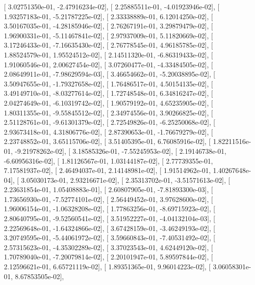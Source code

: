 \documentclass{article}
\begin{document}
       [  3.02751350e-01,  -2.47916234e-02],
       [  2.25885511e-01,  -4.01923946e-02],
       [  1.93257183e-01,  -5.21787225e-02],
       [  2.33338889e-01,   6.12014250e-02],
       [  3.50167035e-01,  -4.28185946e-02],
       [  2.76267191e-01,   3.29879479e-02],
       [  1.96900331e-01,  -5.11467841e-02],
       [  2.97937009e-01,   5.11820669e-02],
       [  3.17246433e-01,  -7.16635430e-02],
       [  2.76778545e-01,   4.96185785e-02],
       [  1.88524579e-01,   1.95524512e-02],
       [  2.14511320e-01,  -6.86319433e-02],
       [  1.91060546e-01,   2.00627454e-02],
       [  3.07260477e-01,  -4.33484505e-02],
       [  2.08649911e-01,  -7.98629594e-03],
       [  3.46654662e-01,  -5.20038895e-02],
       [  3.50947655e-01,  -1.79327658e-02],
       [  1.76486517e-01,   4.50154135e-02],
       [  3.49149710e-01,  -8.03277614e-02],
       [  1.72748548e-01,   6.34816247e-02],
       [  2.04274649e-01,  -6.10319742e-02],
       [  1.90579192e-01,   4.65235905e-02],
       [  1.80311355e-01,  -9.55845512e-02],
       [  2.34974556e-01,   3.90266825e-02],
       [  2.51128761e-01,  -9.61301379e-02],
       [  2.72549826e-01,  -6.25250068e-02],
       [  2.93673418e-01,   4.31806776e-02],
       [  2.87390653e-01,  -1.76679279e-02],
       [  2.23748852e-01,   3.65115706e-02],
       [  3.51405395e-01,   6.76085916e-02],
       [  1.82211516e-01,  -9.21978262e-02],
       [  3.18585326e-01,  -7.55245953e-02],
       [  2.19146738e-01,  -6.60956316e-02],
       [  1.81126567e-01,   1.03144187e-02],
       [  2.77739355e-01,   7.17581937e-02],
       [  2.46494037e-01,   2.14148981e-02],
       [  1.91514962e-01,   1.40267648e-04],
       [  3.05030173e-01,   2.93216671e-02],
       [  2.35313702e-01,  -3.51571613e-02],
       [  2.23631854e-01,   1.05408883e-01],
       [  2.60807905e-01,  -7.81893300e-03],
       [  1.73656930e-01,  -7.52774101e-02],
       [  2.56449452e-01,   3.97628600e-02],
       [  1.96006154e-01,  -1.06328208e-02],
       [  1.77863256e-01,  -8.69715923e-02],
       [  2.80640795e-01,  -9.52560541e-02],
       [  3.51952227e-01,  -4.04132104e-03],
       [  2.22569648e-01,  -1.64324866e-02],
       [  3.67428159e-01,  -3.46249193e-02],
       [  3.20749595e-01,  -5.44061972e-02],
       [  3.59660843e-01,  -7.40531492e-02],
       [  2.57315623e-01,  -4.35302289e-02],
       [  3.37023543e-01,   4.62449120e-02],
       [  1.70789040e-01,  -7.20079814e-02],
       [  2.20101947e-01,   5.89597844e-02],
       [  2.12596621e-01,   6.65721119e-02],
       [  1.89351365e-01,   9.96014223e-02],
       [  3.06058301e-01,   8.67853505e-02],
\end{document}

